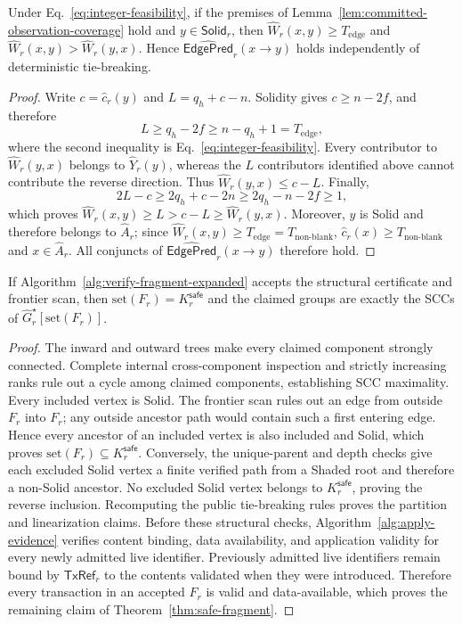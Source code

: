 \begin{lemma}
\label{lem:fair-edge-formation}
Under Eq.~\eqref{eq:integer-feasibility}, if the premises of
Lemma~\ref{lem:committed-observation-coverage} hold and
$y\in\mathsf{Solid}_r$, then
$\widehat W_r(x,y)\ge T_{\mathrm{edge}}$ and
$\widehat W_r(x,y)>\widehat W_r(y,x)$.  Hence
$\widehat{\mathsf{EdgePred}}_r(x\to y)$ holds independently
of deterministic tie-breaking.
\end{lemma}

\begin{proof}
Write $c=\widehat c_r(y)$ and $L=q_h+c-n$.  Solidity gives
$c\ge n-2f$, and therefore
\[
 L\ge q_h-2f\ge n-q_h+1=T_{\mathrm{edge}},
\]
where the second inequality is Eq.~\eqref{eq:integer-feasibility}.  Every
contributor to $\widehat W_r(y,x)$ belongs to $\widehat Y_r(y)$, whereas the $L$ contributors
identified above cannot contribute the reverse direction.  Thus
$\widehat W_r(y,x)\le c-L$.  Finally,
\[
 2L-c\ge2q_h+c-2n\ge2q_h-n-2f\ge1,
\]
which proves
$\widehat W_r(x,y)\ge L>c-L\ge\widehat W_r(y,x)$.  Moreover, $y$ is Solid and
therefore belongs to $\widehat A_r$; since
$\widehat W_r(x,y)\ge T_{\mathrm{edge}}=T_{\mathrm{non\mbox{-}blank}}$,
$\widehat c_r(x)\ge T_{\mathrm{non\mbox{-}blank}}$ and
$x\in\widehat A_r$.  All conjuncts of
$\widehat{\mathsf{EdgePred}}_r(x\to y)$ therefore
hold.
\end{proof}

\begin{lemma}
\label{lem:safe-closure-certificate}
If Algorithm~\ref{alg:verify-fragment-expanded} accepts the structural certificate and
frontier scan, then $\mathrm{set}(F_r)=K_r^{\mathsf{safe}}$ and the claimed
groups are exactly the SCCs of
$\widehat G_r^\star[\mathrm{set}(F_r)]$.
\end{lemma}

\begin{proof}
The inward and outward trees make every claimed component strongly connected.
Complete internal cross-component inspection and strictly increasing ranks
rule out a cycle among claimed components, establishing SCC maximality.  Every
included vertex is Solid.  The frontier scan rules out an edge from outside
$F_r$ into $F_r$; any outside ancestor path would contain such a first entering
edge.  Hence every ancestor of an included vertex is also included and Solid,
which proves $\mathrm{set}(F_r)\subseteq K_r^{\mathsf{safe}}$.  Conversely, the
unique-parent and depth checks give each excluded Solid vertex a finite
verified path from a Shaded root and therefore a non-Solid ancestor.  No
excluded Solid vertex belongs to
$K_r^{\mathsf{safe}}$, proving the reverse inclusion.  Recomputing the public
tie-breaking rules proves the partition and linearization claims.  Before
these structural checks, Algorithm~\ref{alg:apply-evidence} verifies content
binding, data availability, and application validity for every newly admitted
live identifier.  Previously admitted live identifiers remain bound by
$\mathsf{TxRef}_r$ to the contents validated when they were introduced.
Therefore every transaction in an accepted $F_r$ is valid and data-available,
which proves the remaining claim of Theorem~\ref{thm:safe-fragment}.
\end{proof}

